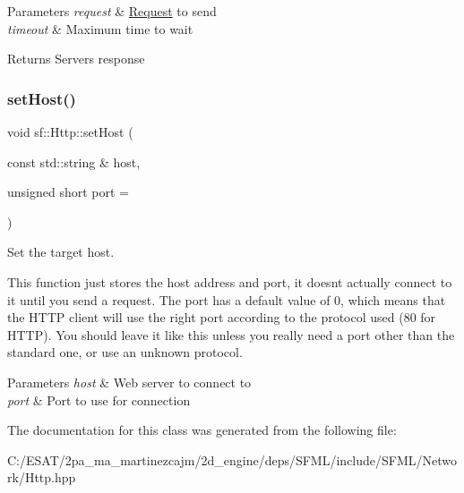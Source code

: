 \begin{DoxyParams}{Parameters}
{\em request} & \hyperlink{classsf_1_1_http_1_1_request}{Request} to send \\
\hline
{\em timeout} & Maximum time to wait\\
\hline
\end{DoxyParams}
\begin{DoxyReturn}{Returns}
Server\textquotesingle{}s response 
\end{DoxyReturn}
\mbox{\label{classsf_1_1_http_a55121d543b61c41cf20b885a97b04e65}} 
\subsubsection{\texorpdfstring{set\+Host()}{setHost()}}
{\footnotesize\ttfamily void sf\+::\+Http\+::set\+Host (\begin{DoxyParamCaption}\item[{const std\+::string \&}]{host,  }\item[{unsigned short}]{port = {} }\end{DoxyParamCaption})}



Set the target host. 

This function just stores the host address and port, it doesn\textquotesingle{}t actually connect to it until you send a request. The port has a default value of 0, which means that the H\+T\+TP client will use the right port according to the protocol used (80 for H\+T\+TP). You should leave it like this unless you really need a port other than the standard one, or use an unknown protocol.


\begin{DoxyParams}{Parameters}
{\em host} & Web server to connect to \\
\hline
{\em port} & Port to use for connection \\
\hline
\end{DoxyParams}


The documentation for this class was generated from the following file\+:\begin{DoxyCompactItemize}
\item 
C\+:/\+E\+S\+A\+T/2pa\+\_\+ma\+\_\+martinezcajm/2d\+\_\+engine/deps/\+S\+F\+M\+L/include/\+S\+F\+M\+L/\+Network/Http.\+hpp\end{DoxyCompactItemize}
